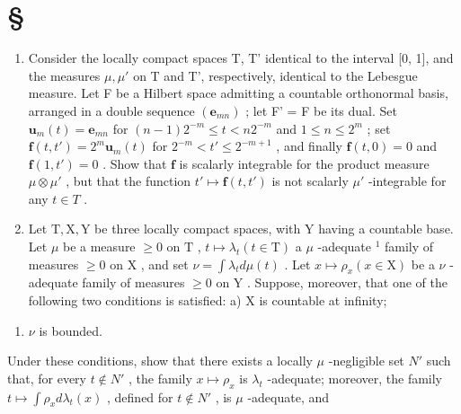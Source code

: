 \section*{\texorpdfstring{\S\CurrentExerciseGroup}{Section \CurrentExerciseGroup}}
{}

\begin{enumerate}
\def\labelenumi{\arabic{enumi})}
\item
  Consider the locally compact spaces T, T' identical to the interval {[}0, 1{]}, and the measures \(\mu, \mu'\) on T and T', respectively, identical to the Lebesgue measure. Let F be a Hilbert space admitting a countable orthonormal basis, arranged in a double sequence \((\mathbf{e}_{mn})\) ; let F' = F be its dual. Set \(\mathbf{u}_m(t) = \mathbf{e}_{mn}\) for \((n-1)2^{-m} \leqslant t < n2^{-m}\) and \(1 \leqslant n \leqslant 2^m\) ; set \(\mathbf{f}(t, t') = 2^m \mathbf{u}_m(t)\) for \(2^{-m} < t' \leqslant 2^{-m+1}\) , and finally \(\mathbf{f}(t, 0) = 0\) and \(\mathbf{f}(1, t') = 0\) . Show that \(\mathbf{f}\) is scalarly integrable for the product measure \(\mu \otimes \mu'\) , but that the function \(t' \mapsto \mathbf{f}(t, t')\) is not scalarly \(\mu'\) -integrable for any \(t \in T\) .
\item
  Let \(\mathrm{T}, \mathrm{X}, \mathrm{Y}\) be three locally compact spaces, with \(\mathrm{Y}\) having a countable base. Let \(\mu\) be a measure \(\geqslant 0\) on \(\mathrm{T}\) , \(t \mapsto \lambda_t (t \in \mathrm{T})\) a \(\mu\) -adequate \(^1\) family of measures \(\geqslant 0\) on \(\mathrm{X}\) , and set \(\nu = \int \lambda_t d\mu(t)\) . Let \(x \mapsto \rho_x (x \in \mathrm{X})\) be a \(\nu\) -adequate family of measures \(\geqslant 0\) on \(\mathrm{Y}\) . Suppose, moreover, that one of the following two conditions is satisfied: a) \(\mathrm{X}\) is countable at infinity;
\end{enumerate}

\begin{enumerate}
\def\labelenumi{\alph{enumi})}
\setcounter{enumi}{1}
\tightlist
\item
  \(\nu\) is bounded.
\end{enumerate}

Under these conditions, show that there exists a locally \(\mu\) -negligible set \(N'\) such that, for every \(t \notin N'\) , the family \(x \mapsto \rho_x\) is \(\lambda_t\) -adequate; moreover, the family \(t \mapsto \int \rho_x d\lambda_t(x)\) , defined for \(t \notin N'\) , is \(\mu\) -adequate, and

